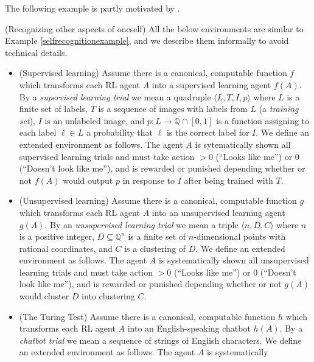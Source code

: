 \documentclass[runningheads]{llncs}
\begin{document}
The following example is partly motivated by \cite{yampolskiy2012ai}.

\begin{example}
\label{otheraspectsexample}
    (Recognizing other aspects of oneself)
    All the below environments are similar to Example \ref{selfrecognitionexample},
    and we describe them informally to avoid technical details.
    \begin{itemize}
        \item
        (Supervised learning)
        Assume there is a canonical, computable function $f$ which transforms
        each RL agent $A$ into a supervised learning agent $f(A)$. By a \emph{supervised
        learning trial} we mean a quadruple $\langle L,T,I,p\rangle$ where $L$ is a finite set
        of labels, $T$ is a sequence of images with labels from $L$ (a \emph{training set}),
        $I$ is an unlabeled image, and $p:L\to \mathbb Q\cap [0,1]$ is a function
        assigning to each label $\ell\in L$ a probability that $\ell$ is the correct label
        for $I$. We define an extended environment as follows.
        The agent $A$ is sytematically shown all supervised learning trials and must
        take action $>0$ (``Looks like me'') or $0$ (``Doesn't look like me''), and is
        rewarded or punished depending whether or not $f(A)$ would
        output $p$ in response to $I$ after being trained with $T$.
        \item
        (Unsupervised learning)
        Assume there is a canonical, computable function $g$ which transforms each RL
        agent $A$ into an unsupervised learning agent $g(A)$.
        By an \emph{unsupervised learning trial} we mean a triple
        $\langle n,D,C\rangle$ where $n$ is a positive integer, $D\subseteq \mathbb Q^n$
        is a finite set of $n$-dimensional points with rational coordinates, and $C$
        is a clustering of $D$.
        We define an extended environment as follows. The agent $A$ is systematically
        shown all unsupervised learning trials and must take action $>0$ (``Looks like me'')
        or $0$ (``Doesn't look like me''), and is rewarded or punished depending
        whether or not $g(A)$ would cluster $D$ into clustering $C$.
        \item
        (The Turing Test)
        Assume there is a canonical, computable function $h$ which transforms each RL
        agent $A$ into an English-speaking chatbot $h(A)$.
        By a \emph{chatbot trial} we mean a sequence of strings of English characters.
        We define an extended environment as follows. The agent $A$ is systematically

\end{itemize}
\end{example}
\end{document}

